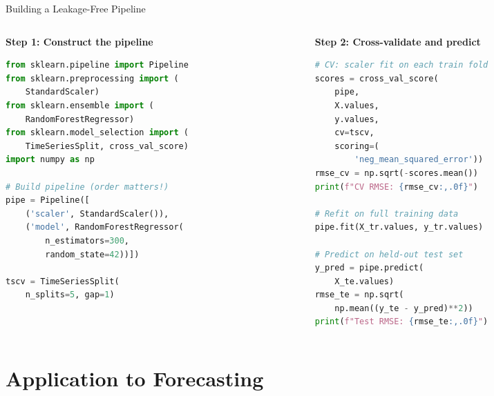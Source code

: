 \documentclass[aspectratio=169, 10pt]{beamer}
\begin{document}
\begin{frame}[fragile]{Building a Leakage-Free Pipeline}
  \begin{columns}[T]
    \begin{column}{0.50\textwidth}
      \textbf{Step 1: Construct the pipeline}
\begin{lstlisting}[language=Python,
                   basicstyle=\tiny\ttfamily]
from sklearn.pipeline import Pipeline
from sklearn.preprocessing import (
    StandardScaler)
from sklearn.ensemble import (
    RandomForestRegressor)
from sklearn.model_selection import (
    TimeSeriesSplit, cross_val_score)
import numpy as np

# Build pipeline (order matters!)
pipe = Pipeline([
    ('scaler', StandardScaler()),
    ('model', RandomForestRegressor(
        n_estimators=300,
        random_state=42))])

tscv = TimeSeriesSplit(
    n_splits=5, gap=1)
\end{lstlisting}
    \end{column}
    \begin{column}{0.47\textwidth}
      \textbf{Step 2: Cross-validate and predict}
\begin{lstlisting}[language=Python,
                   basicstyle=\tiny\ttfamily]
# CV: scaler fit on each train fold
scores = cross_val_score(
    pipe,
    X.values,
    y.values,
    cv=tscv,
    scoring=(
        'neg_mean_squared_error'))
rmse_cv = np.sqrt(-scores.mean())
print(f"CV RMSE: {rmse_cv:,.0f}")

# Refit on full training data
pipe.fit(X_tr.values, y_tr.values)

# Predict on held-out test set
y_pred = pipe.predict(
    X_te.values)
rmse_te = np.sqrt(
    np.mean((y_te - y_pred)**2))
print(f"Test RMSE: {rmse_te:,.0f}")
\end{lstlisting}
    \end{column}
  \end{columns}
\end{frame}

\section{Application to Forecasting}
\end{document}
